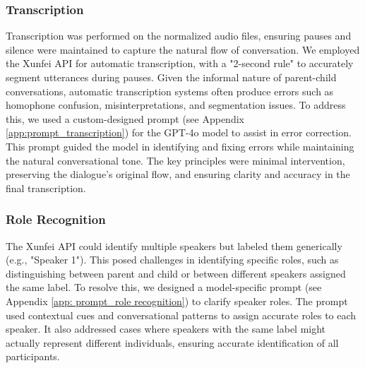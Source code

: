 \subsubsection{Transcription}

Transcription was performed on the normalized audio files, ensuring pauses and silence were maintained to capture the natural flow of conversation. We employed the Xunfei API \cite{xunfei} for automatic transcription, with a "2-second rule" to accurately segment utterances during pauses. Given the informal nature of parent-child conversations, automatic transcription systems often produce errors such as homophone confusion, misinterpretations, and segmentation issues. To address this, we used a custom-designed prompt (see Appendix \ref{app:prompt_transcription}) for the GPT-4o model to assist in error correction. This prompt guided the model in identifying and fixing errors while maintaining the natural conversational tone. The key principles were minimal intervention, preserving the dialogue's original flow, and ensuring clarity and accuracy in the final transcription.

\subsubsection{Role Recognition} \label{subsec: roles}
The Xunfei API could identify multiple speakers but labeled them generically (e.g., "Speaker 1"). This posed challenges in identifying specific roles, such as distinguishing between parent and child or between different speakers assigned the same label. To resolve this, we designed a model-specific prompt (see Appendix \ref{app: prompt_role recognition}) to clarify speaker roles. The prompt used contextual cues and conversational patterns to assign accurate roles to each speaker. It also addressed cases where speakers with the same label might actually represent different individuals, ensuring accurate identification of all participants.

